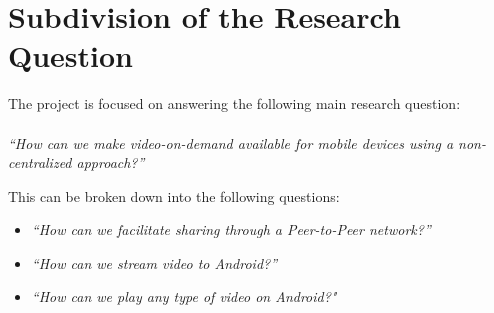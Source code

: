 \section{Subdivision of the Research Question}
The project is focused on answering the following main research question:\\
\\
\textit{``How can we make video-on-demand available for mobile devices using a non-centralized approach?''}

This can be broken down into the following questions:

\begin{itemize}
	\item\textit{``How can we facilitate sharing through a Peer-to-Peer network?''}
	\item\textit{``How can we stream video to Android?''}
	\item\textit{``How can we play any type of video on Android?"}


\end{itemize}
